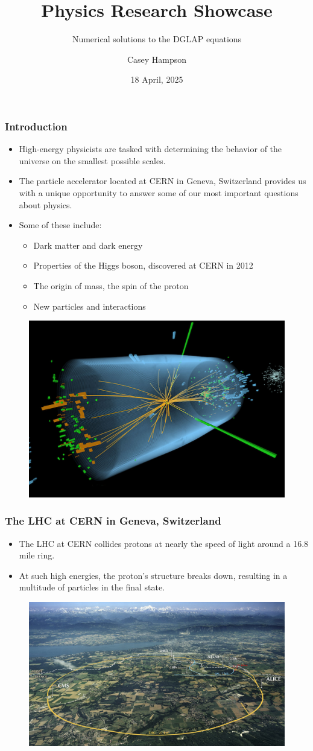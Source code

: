 \documentclass{beamer}
\title{Physics Research Showcase}
\subtitle{Numerical solutions to the DGLAP equations}
\author{Casey Hampson}
\date{18 April, 2025}
\institute[]{NSF Grant: PHY-2412071}
\begin{document}
\frame{\titlepage}



\begin{frame}
  \frametitle{Introduction}

  \begin{itemize}
  \item High-energy physicists are tasked with determining the behavior of the universe on the smallest possible scales.
  \item The particle accelerator located at CERN in Geneva, Switzerland provides us with a unique opportunity to answer some of our most important questions about physics.
  \item Some of these include:
    \begin{itemize}
    \item Dark matter and dark energy
    \item Properties of the Higgs boson, discovered at CERN in 2012
    \item The origin of mass, the spin of the proton
    \item New particles and interactions
    \end{itemize}
  \end{itemize}

  \begin{figure}
    \centering
    \includegraphics[width=0.35\linewidth]{./gfx/lhc.jpg}
  \end{figure}
  
\end{frame}


\begin{frame}
  \frametitle{The LHC at CERN in Geneva, Switzerland}

  \begin{itemize}
  \item The LHC at CERN collides protons at nearly the speed of light around a 16.8 mile ring.
  \item At such high energies, the proton's structure breaks down, resulting in a multitude of particles in the final state.
  \end{itemize}

  \begin{figure}
    \centering
    \includegraphics[width=0.7\linewidth]{./gfx/lhc-map.jpg}
  \end{figure}
\end{frame}
\end{document}
